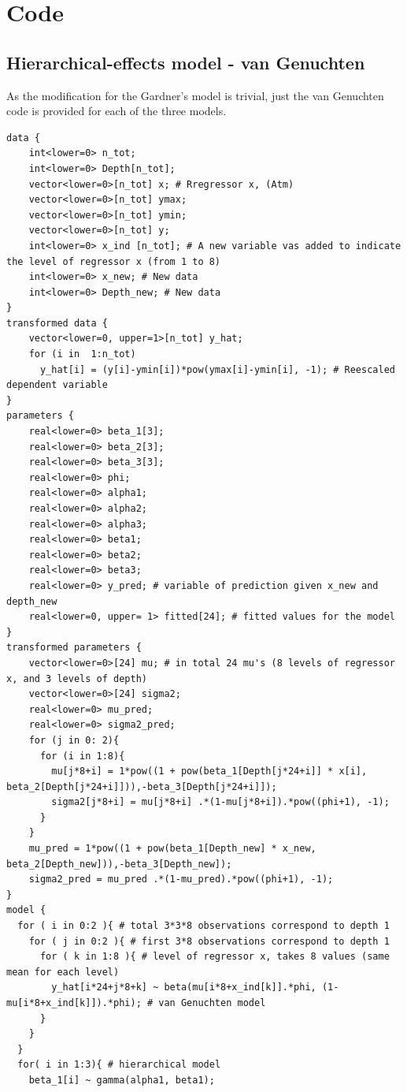 \documentclass{article}
\begin{document}
\newpage
\section{Code}
\subsection*{Hierarchical-effects model - van Genuchten}
As the modification for the Gardner's model is trivial, just the van Genuchten code is provided for each of the three models. 
\begin{lstlisting}
data {
    int<lower=0> n_tot;
    int<lower=0> Depth[n_tot];
    vector<lower=0>[n_tot] x; # Rregressor x, (Atm)
    vector<lower=0>[n_tot] ymax;
    vector<lower=0>[n_tot] ymin;
    vector<lower=0>[n_tot] y;
    int<lower=0> x_ind [n_tot]; # A new variable vas added to indicate the level of regressor x (from 1 to 8)
    int<lower=0> x_new; # New data
    int<lower=0> Depth_new; # New data
}
transformed data {
    vector<lower=0, upper=1>[n_tot] y_hat;
    for (i in  1:n_tot)
      y_hat[i] = (y[i]-ymin[i])*pow(ymax[i]-ymin[i], -1); # Reescaled dependent variable
}
parameters {
    real<lower=0> beta_1[3];
    real<lower=0> beta_2[3];
    real<lower=0> beta_3[3];
    real<lower=0> phi;
    real<lower=0> alpha1;
    real<lower=0> alpha2;
    real<lower=0> alpha3;
    real<lower=0> beta1;
    real<lower=0> beta2;
    real<lower=0> beta3;
    real<lower=0> y_pred; # variable of prediction given x_new and depth_new
    real<lower=0, upper= 1> fitted[24]; # fitted values for the model
}
transformed parameters {
    vector<lower=0>[24] mu; # in total 24 mu's (8 levels of regressor x, and 3 levels of depth)
    vector<lower=0>[24] sigma2;
    real<lower=0> mu_pred;
    real<lower=0> sigma2_pred;
    for (j in 0: 2){
      for (i in 1:8){
        mu[j*8+i] = 1*pow((1 + pow(beta_1[Depth[j*24+i]] * x[i], beta_2[Depth[j*24+i]])),-beta_3[Depth[j*24+i]]);
        sigma2[j*8+i] = mu[j*8+i] .*(1-mu[j*8+i]).*pow((phi+1), -1);
      }
    }
    mu_pred = 1*pow((1 + pow(beta_1[Depth_new] * x_new, beta_2[Depth_new])),-beta_3[Depth_new]);
    sigma2_pred = mu_pred .*(1-mu_pred).*pow((phi+1), -1);
}
model {
  for ( i in 0:2 ){ # total 3*3*8 observations correspond to depth 1
    for ( j in 0:2 ){ # first 3*8 observations correspond to depth 1
      for ( k in 1:8 ){ # level of regressor x, takes 8 values (same mean for each level)
        y_hat[i*24+j*8+k] ~ beta(mu[i*8+x_ind[k]].*phi, (1-mu[i*8+x_ind[k]]).*phi); # van Genuchten model
      }
    }
  }
  for( i in 1:3){ # hierarchical model
    beta_1[i] ~ gamma(alpha1, beta1);

\end{lstlisting}
\end{document}
